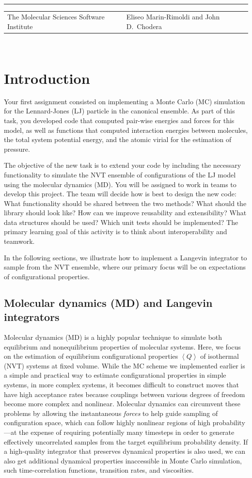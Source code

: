 \documentclass[aip,jcp,preprint,superscriptaddress,floatfix]{revtex4-1}
\renewcommand{\title}[1]{\textbf{\large{#1}}\\}
\newcommand{\leftright}[2]{\begin{tabularx}{\textwidth}{X>{\raggedleft}X}#1%
& #2\\\end{tabularx}\\[-1cm]}
\begin{document}
\title{ }
\rule{\textwidth}{1pt}
\leftright{The Molecular Sciences Software Institute}{Eliseo Marin-Rimoldi and John D.~Chodera} %

\bigskip

\section{Introduction}

Your first assignment consisted on implementing a Monte Carlo (MC) simulation
for the Lennard-Jones (LJ) particle in the canonical ensemble. 
As part of this task,
you developed code that computed pair-wise energies and forces for this model, 
as well as functions that computed interaction energies between molecules,
the total system potential energy, and the atomic virial for the estimation of pressure.

The objective of the new task is to extend your code by including the
necessary functionality to simulate the NVT ensemble of configurations 
of the LJ model using the molecular dynamics (MD). You will be 
assigned to work in teams to develop this project. The team will
decide how is best to design the new code: What functionality should be shared
between the two methods? What should the library should look like? How can
we improve reusability and extensibility? What data
structures should be used? Which unit tests should be implemented?
The primary learning goal of this activity is to think about interoperability and teamwork.

In the following sections, we illustrate how to implement a Langevin integrator to sample from the NVT ensemble, where our primary focus will be on expectations of configurational properties.

\subsection{Molecular dynamics (MD) and Langevin integrators}

Molecular dynamics (MD) is a highly popular technique to simulate both equilibrium and nonequilibrium properties of molecular systems.
Here, we focus on the estimation of equilibrium configurational properties $\left< Q \right>$ of isothermal (NVT) systems at fixed volume.
While the MC scheme we implemented earlier is a simple and practical way to estimate configurational properties in simple systems, in more complex systems, it becomes difficult to construct moves that have high acceptance rates because couplings between various degrees of freedom become more complex and nonlinear.
Molecular dynamics can circumvent these problems by allowing the instantaneous \emph{forces} to help guide sampling of configuration space, which can follow highly nonlinear regions of high probability---at the expense of requiring potentially many timesteps in order to generate effectively uncorrelated samples from the target equilibrium probability density.
If a high-quality integrator that preserves dynamical properties is also used, we can also get additional dynamical properties inaccessible in Monte Carlo simulation, such time-correlation functions, transition rates, and viscosities. 
\end{document}
